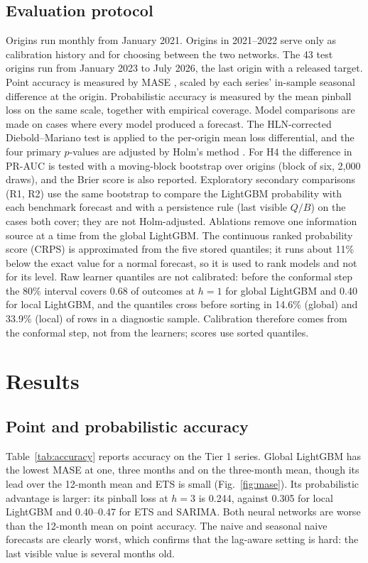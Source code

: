 \documentclass[conference]{IEEEtran}
\begin{document}
\subsection{Evaluation protocol}
Origins run monthly from January 2021. Origins in 2021--2022 serve only as calibration history and for choosing between the two networks. The 43 test origins run from January 2023 to July 2026, the last origin with a released target. Point accuracy is measured by MASE \cite{hyndman2006}, scaled by each series' in-sample seasonal difference at the origin. Probabilistic accuracy is measured by the mean pinball loss on the same scale, together with empirical coverage. Model comparisons are made on cases where every model produced a forecast. The HLN-corrected Diebold--Mariano test \cite{diebold1995,harvey1997} is applied to the per-origin mean loss differential, and the four primary $p$-values are adjusted by Holm's method \cite{holm1979}. For H4 the difference in PR-AUC \cite{saito2015} is tested with a moving-block bootstrap over origins (block of six, 2,000 draws), and the Brier score \cite{brier1950} is also reported. Exploratory secondary comparisons (R1, R2) use the same bootstrap to compare the LightGBM probability with each benchmark forecast and with a persistence rule (last visible $Q/B$) on the cases both cover; they are not Holm-adjusted. Ablations remove one information source at a time from the global LightGBM. The continuous ranked probability score (CRPS) is approximated from the five stored quantiles; it runs about 11\% below the exact value for a normal forecast, so it is used to rank models and not for its level. Raw learner quantiles are not calibrated: before the conformal step the 80\% interval covers 0.68 of outcomes at $h=1$ for global LightGBM and 0.40 for local LightGBM, and the quantiles cross before sorting in 14.6\% (global) and 33.9\% (local) of rows in a diagnostic sample. Calibration therefore comes from the conformal step, not from the learners; scores use sorted quantiles.

\section{Results}\label{sec:results}

\subsection{Point and probabilistic accuracy}
Table~\ref{tab:accuracy} reports accuracy on the Tier 1 series. Global LightGBM has the lowest MASE at one, three months and on the three-month mean, though its lead over the 12-month mean and ETS is small (Fig.~\ref{fig:mase}). Its probabilistic advantage is larger: its pinball loss at $h=3$ is 0.244, against 0.305 for local LightGBM and 0.40--0.47 for ETS and SARIMA. Both neural networks are worse than the 12-month mean on point accuracy. The naive and seasonal naive forecasts are clearly worst, which confirms that the lag-aware setting is hard: the last visible value is several months old.
\end{document}
